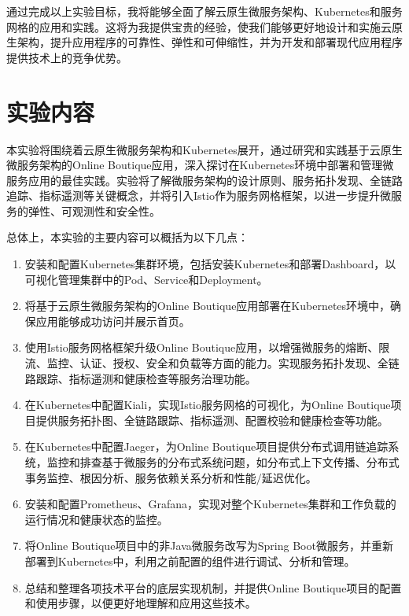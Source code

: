 通过完成以上实验目标，我将能够全面了解云原生微服务架构、Kubernetes和服务网格的应用和实践。这将为我提供宝贵的经验，使我们能够更好地设计和实施云原生架构，提升应用程序的可靠性、弹性和可伸缩性，并为开发和部署现代应用程序提供技术上的竞争优势。

\section{实验内容}

本实验将围绕着云原生微服务架构和Kubernetes展开，通过研究和实践基于云原生微服务架构的Online Boutique应用，深入探讨在Kubernetes环境中部署和管理微服务应用的最佳实践。实验将了解微服务架构的设计原则、服务拓扑发现、全链路追踪、指标遥测等关键概念，并将引入Istio作为服务网格框架，以进一步提升微服务的弹性、可观测性和安全性。

总体上，本实验的主要内容可以概括为以下几点：

\begin{enumerate}
	\item 安装和配置Kubernetes集群环境，包括安装Kubernetes和部署Dashboard，以可视化管理集群中的Pod、Service和Deployment。
	\item 将基于云原生微服务架构的Online Boutique应用部署在Kubernetes环境中，确保应用能够成功访问并展示首页。
	\item 使用Istio服务网格框架升级Online Boutique应用，以增强微服务的熔断、限流、监控、认证、授权、安全和负载等方面的能力。实现服务拓扑发现、全链路跟踪、指标遥测和健康检查等服务治理功能。
	\item 在Kubernetes中配置Kiali，实现Istio服务网格的可视化，为Online Boutique项目提供服务拓扑图、全链路跟踪、指标遥测、配置校验和健康检查等功能。
	\item 在Kubernetes中配置Jaeger，为Online Boutique项目提供分布式调用链追踪系统，监控和排查基于微服务的分布式系统问题，如分布式上下文传播、分布式事务监控、根因分析、服务依赖关系分析和性能/延迟优化。
	\item 安装和配置Prometheus、Grafana，实现对整个Kubernetes集群和工作负载的运行情况和健康状态的监控。
	\item 将Online Boutique项目中的非Java微服务改写为Spring Boot微服务，并重新部署到Kubernetes中，利用之前配置的组件进行调试、分析和管理。
	\item 总结和整理各项技术平台的底层实现机制，并提供Online Boutique项目的配置和使用步骤，以便更好地理解和应用这些技术。
\end{enumerate}
